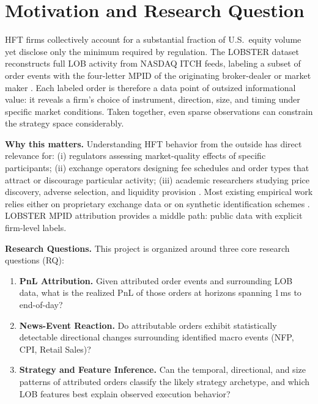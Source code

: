 \documentclass[11pt, letterpaper]{article}
\begin{document}
\vspace{10pt}

\section{Motivation and Research Question}

HFT firms collectively account for a substantial fraction of U.S.\ equity volume
yet disclose only the minimum required by regulation.
The LOBSTER dataset reconstructs full LOB activity from NASDAQ ITCH feeds,
labeling a subset of order events with the four-letter MPID of the originating
broker-dealer or market maker \citep{Huang2011}.
Each labeled order is therefore a data point of outsized informational value:
it reveals a firm's choice of instrument, direction, size, and timing under
specific market conditions.
Taken together, even sparse observations can constrain the strategy space
considerably.

\textbf{Why this matters.}
Understanding HFT behavior from the outside has direct relevance for:
(i) regulators assessing market-quality effects of specific participants;
(ii) exchange operators designing fee schedules and order types that attract
or discourage particular activity;
(iii) academic researchers studying price discovery, adverse selection, and
liquidity provision \citep{Brogaard2014,Menkveld2013}.
Most existing empirical work relies either on proprietary exchange data
\citep{Baron2019,Carrion2013} or on synthetic identification schemes
\citep{Hasbrouck2013,Zhang2010}.
LOBSTER MPID attribution provides a middle path: public data with explicit
firm-level labels.

\textbf{Research Questions.} This project is organized around three core
research questions (RQ):

\begin{enumerate}[label=\textbf{RQ\arabic*.}, leftmargin=2.2cm]
  \item \textbf{PnL Attribution.}
    Given attributed order events and surrounding LOB data, what is the
    realized PnL of those orders at horizons spanning 1\,ms to end-of-day?

  \item \textbf{News-Event Reaction.}
    Do attributable orders exhibit statistically detectable directional changes
    surrounding identified macro events (NFP, CPI, Retail Sales)?

  \item \textbf{Strategy and Feature Inference.}
    Can the temporal, directional, and size patterns of attributed orders
    classify the likely strategy archetype, and which LOB features best explain
    observed execution behavior?
\end{enumerate}
\end{document}
